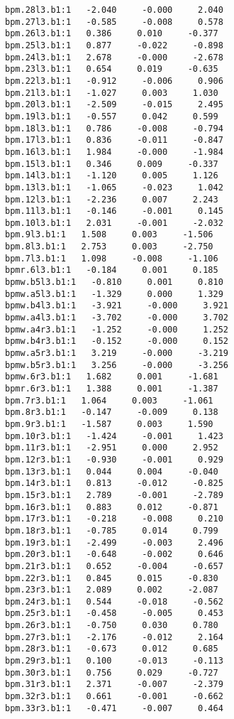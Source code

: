 \begin{verbatim}
bpm.28l3.b1:1   -2.040     -0.000     2.040
bpm.27l3.b1:1   -0.585     -0.008     0.578
bpm.26l3.b1:1   0.386     0.010     -0.377
bpm.25l3.b1:1   0.877     -0.022     -0.898
bpm.24l3.b1:1   2.678     -0.000     -2.678
bpm.23l3.b1:1   0.654     0.019     -0.635
bpm.22l3.b1:1   -0.912     -0.006     0.906
bpm.21l3.b1:1   -1.027     0.003     1.030
bpm.20l3.b1:1   -2.509     -0.015     2.495
bpm.19l3.b1:1   -0.557     0.042     0.599
bpm.18l3.b1:1   0.786     -0.008     -0.794
bpm.17l3.b1:1   0.836     -0.011     -0.847
bpm.16l3.b1:1   1.984     -0.000     -1.984
bpm.15l3.b1:1   0.346     0.009     -0.337
bpm.14l3.b1:1   -1.120     0.005     1.126
bpm.13l3.b1:1   -1.065     -0.023     1.042
bpm.12l3.b1:1   -2.236     0.007     2.243
bpm.11l3.b1:1   -0.146     -0.001     0.145
bpm.10l3.b1:1   2.031     -0.001     -2.032
bpm.9l3.b1:1   1.508     0.003     -1.506
bpm.8l3.b1:1   2.753     0.003     -2.750
bpm.7l3.b1:1   1.098     -0.008     -1.106
bpmr.6l3.b1:1   -0.184     0.001     0.185
bpmw.b5l3.b1:1   -0.810     0.001     0.810
bpmw.a5l3.b1:1   -1.329     0.000     1.329
bpmw.b4l3.b1:1   -3.921     -0.000     3.921
bpmw.a4l3.b1:1   -3.702     -0.000     3.702
bpmw.a4r3.b1:1   -1.252     -0.000     1.252
bpmw.b4r3.b1:1   -0.152     -0.000     0.152
bpmw.a5r3.b1:1   3.219     -0.000     -3.219
bpmw.b5r3.b1:1   3.256     -0.000     -3.256
bpmw.6r3.b1:1   1.682     0.001     -1.681
bpmr.6r3.b1:1   1.388     0.001     -1.387
bpm.7r3.b1:1   1.064     0.003     -1.061
bpm.8r3.b1:1   -0.147     -0.009     0.138
bpm.9r3.b1:1   -1.587     0.003     1.590
bpm.10r3.b1:1   -1.424     -0.001     1.423
bpm.11r3.b1:1   -2.951     0.000     2.952
bpm.12r3.b1:1   -0.930     -0.001     0.929
bpm.13r3.b1:1   0.044     0.004     -0.040
bpm.14r3.b1:1   0.813     -0.012     -0.825
bpm.15r3.b1:1   2.789     -0.001     -2.789
bpm.16r3.b1:1   0.883     0.012     -0.871
bpm.17r3.b1:1   -0.218     -0.008     0.210
bpm.18r3.b1:1   -0.785     0.014     0.799
bpm.19r3.b1:1   -2.499     -0.003     2.496
bpm.20r3.b1:1   -0.648     -0.002     0.646
bpm.21r3.b1:1   0.652     -0.004     -0.657
bpm.22r3.b1:1   0.845     0.015     -0.830
bpm.23r3.b1:1   2.089     0.002     -2.087
bpm.24r3.b1:1   0.544     -0.018     -0.562
bpm.25r3.b1:1   -0.458     -0.005     0.453
bpm.26r3.b1:1   -0.750     0.030     0.780
bpm.27r3.b1:1   -2.176     -0.012     2.164
bpm.28r3.b1:1   -0.673     0.012     0.685
bpm.29r3.b1:1   0.100     -0.013     -0.113
bpm.30r3.b1:1   0.756     0.029     -0.727
bpm.31r3.b1:1   2.371     -0.007     -2.379
bpm.32r3.b1:1   0.661     -0.001     -0.662
bpm.33r3.b1:1   -0.471     -0.007     0.464

\end{verbatim}
